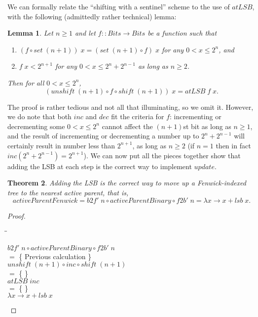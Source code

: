 \documentclass{jfp}
\newcommand{\Conid}[1]{\mathit{#1}}
\newcommand{\Varid}[1]{\mathit{#1}}
\renewcommand{\leq}{\leqslant}
\renewcommand{\geq}{\geqslant}
\providecommand{\pref}{}
\renewcommand{\pref}[1]{\prettyref{#1}}
\newenvironment{sproof}{%
    \begin{tabbing}
    \phantom{$\equiv$} \= \qquad\qquad\qquad\qquad\qquad \= \kill
}{
    \end{tabbing}
}
\newcommand{\stmt}[1]{\> \ensuremath{#1} \\}
\newcommand{\reason}[2]{\ensuremath{#1} \>\> \{ \quad #2 \quad \} \\}
\newtheorem{thm}{Theorem}[section]
\newtheorem{lem}[thm]{Lemma}
\theoremstyle{definition}
\theoremstyle{remark}
\begin{document}
We can formally relate the ``shifting with a sentinel'' scheme to
the use of \ensuremath{\Varid{atLSB}}, with the following (admittedly rather technical)
lemma:

\begin{lem} \label{lem:sentinel-scheme} Let $n \geq 1$ and let \ensuremath{\Varid{f}\mathbin{::}\Conid{Bits}\to \Conid{Bits}} be a function such that
  \begin{enumerate}
  \item \ensuremath{(\Varid{f}\mathbin{\circ}\Varid{set}\;(\Varid{n}\mathbin{+}\mathrm{1}))\;\Varid{x}\mathrel{=}(\Varid{set}\;(\Varid{n}\mathbin{+}\mathrm{1})\mathbin{\circ}\Varid{f})\;\Varid{x}} for any $0 < x \leq
    2^n$, and
  \item $\ensuremath{\Varid{f}\;\Varid{x}} < 2^{n+1}$ for any $0 < x \leq 2^n + 2^{n-1}$ as long
    as $n \geq 2$.
  \end{enumerate}
  Then for all $0 < x \leq 2^n$,
  \[ \ensuremath{(\Varid{unshift}\;(\Varid{n}\mathbin{+}\mathrm{1})\mathbin{\circ}\Varid{f}\mathbin{\circ}\Varid{shift}\;(\Varid{n}\mathbin{+}\mathrm{1}))\;\Varid{x}\mathrel{=}\Varid{atLSB}\;\Varid{f}\;\Varid{x}}. \]
\end{lem}

The proof is rather tedious and not all that illuminating, so we omit
it.  However, we do note that both \ensuremath{\Varid{inc}} and \ensuremath{\Varid{dec}} fit the criteria
for \ensuremath{\Varid{f}}: incrementing or decrementing some $0 < x \leq 2^n$ cannot affect
the $(n+1)$st bit as long as $n \geq 1$, and the result of
incrementing or decrementing a number up to $2^n + 2^{n-1}$ will
certainly result in number less than $2^{n+1}$, as long as $n \geq 2$
(if $n=1$ then in fact $\ensuremath{\Varid{inc}} (2^n + 2^{n-1}) = 2^{n+1}$).  We can now
put all the pieces together show that adding the LSB at each step is
the correct way to implement \ensuremath{\Varid{update}}.

\begin{thm}
  Adding the LSB is the correct way to move up a Fenwick-indexed tree
  to the nearest active parent, that is,
  \[ \ensuremath{\Varid{activeParentFenwick}\mathrel{=}\Varid{b2f'}\;\Varid{n}\mathbin{\circ}\Varid{activeParentBinary}\mathbin{\circ}\Varid{f2b'}\;\Varid{n}\mathrel{=}\lambda \Varid{x}\to \Varid{x}\mathbin{+}\Varid{lsb}\;\Varid{x}}. \]
\end{thm}
\begin{proof}
\begin{sproof}
  \stmt{\ensuremath{\Varid{b2f'}\;\Varid{n}\mathbin{\circ}\Varid{activeParentBinary}\mathbin{\circ}\Varid{f2b'}\;\Varid{n}}}
  \reason{=}{Previous calculation}
  \stmt{\ensuremath{\Varid{unshift}\;(\Varid{n}\mathbin{+}\mathrm{1})\mathbin{\circ}\Varid{inc}\mathbin{\circ}\Varid{shift}\;(\Varid{n}\mathbin{+}\mathrm{1})}}
  \reason{=}{\pref{lem:sentinel-scheme}}
  \stmt{\ensuremath{\Varid{atLSB}\;\Varid{inc}}}
  \reason{=}{\pref{lem:addlsb}}
  \stmt{\ensuremath{\lambda \Varid{x}\to \Varid{x}\mathbin{+}\Varid{lsb}\;\Varid{x}}}
\end{sproof}
\vspace{-3\baselineskip}
\end{proof}
\end{document}
